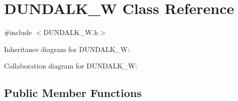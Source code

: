 \hypertarget{class_d_u_n_d_a_l_k___w}{}\section{D\+U\+N\+D\+A\+L\+K\+\_\+W Class Reference}
\label{class_d_u_n_d_a_l_k___w}


{\ttfamily \#include $<$D\+U\+N\+D\+A\+L\+K\+\_\+\+W.\+h$>$}



Inheritance diagram for D\+U\+N\+D\+A\+L\+K\+\_\+W\+:


Collaboration diagram for D\+U\+N\+D\+A\+L\+K\+\_\+W\+:
\subsection*{Public Member Functions}
